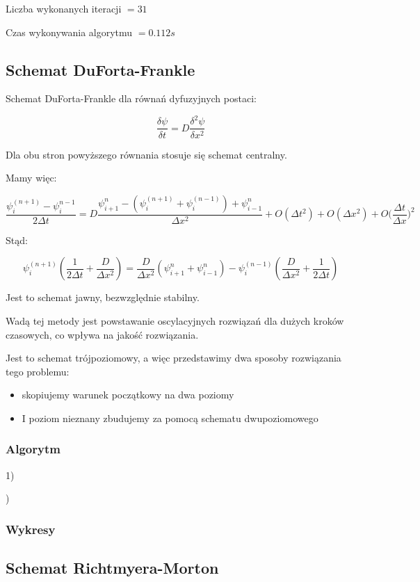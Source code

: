 Liczba wykonanych iteracji $ = 31 $

Czas wykonywania algorytmu $ = 0.112 s$

\newpage
\subsection{Schemat DuForta-Frankle}
Schemat DuForta-Frankle dla równań dyfuzyjnych postaci:

$$\dfrac{\delta \psi}{\delta t} = D\dfrac{\delta^2 \psi}{\delta x^2}$$

Dla obu stron powyższego równania stosuje się schemat centralny.

Mamy więc:

$$\dfrac{\psi^{(n+1)}_{i}-\psi^{n-1}_{i}}{2\Delta t}=D\dfrac{\psi^{n}_{i+1}- \left( \psi^{(n+1)}_{i} + \psi^{(n-1)}_{i} \right)+\psi^n_{i-1}}{\Delta x^2} + O(\Delta t^2) + O(\Delta x^2) +  O\Big(\dfrac{\Delta t}{\Delta x}\Big)^2$$

Stąd:

$$\psi^{(n+1)}_{i} \left(\dfrac{1}{2 \Delta t} + \dfrac{D}{\Delta x^2}\right)= \dfrac{D}{\Delta x^2} \left( \psi^{n}_{i+1} + \psi^{n}_{i-1} \right) - \psi^{(n-1)}_{i} \left( \dfrac{D}{\Delta x^2} + \dfrac{1}{2\Delta t} \right) $$

Jest to schemat jawny, bezwzględnie stabilny. 

Wadą tej metody jest powstawanie oscylacyjnych rozwiązań dla dużych kroków czasowych, co wpływa na jakość rozwiązania.

Jest to schemat trójpoziomowy, a więc przedstawimy dwa sposoby rozwiązania tego problemu:
\begin{itemize}
	\item skopiujemy warunek początkowy na dwa poziomy
	\item I poziom nieznany zbudujemy za pomocą schematu dwupoziomowego
\end{itemize}

\newpage
\subsubsection{Algorytm}
1)

)

\newpage
\subsubsection{Wykresy}
\newpage
\subsection{Schemat Richtmyera-Morton}

